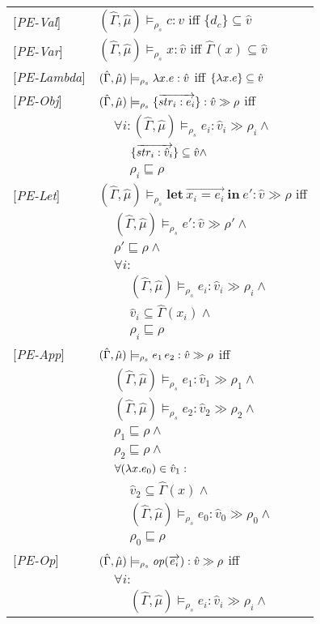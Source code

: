 \documentclass[[12pt,a4paper,twoside,openrigh]{article}
\newcommand{\vat}[0]{\hat{v}}
\newcommand{\muat}[0]{\hat{\mu}}
\newcommand{\Env}[0]{\hat{\Gamma}}
\newcommand{\modelrho}{\models_{\rho_s}}
\newcommand{\aenvs}{(\Env,\muat)}
\newcommand{\caesti}[2]{\aenvs \modelrho #1 : \vat_{#2} \gg \rho_{#2}}
\newcommand{\caest}[1]{\aenvs \modelrho #1 : \vat \gg \rho}
\newcommand{\letexprs}[3]{\mathbf{let}\ \vec{#1 = #2}\ \mathbf{in}\ #3}
\begin{document}
\begin{tabular}{l l l l}
{[\textit{PE-Val}]}&\multicolumn{3}{l}{$\aenvs \modelrho c : \vat$ iff $\{d_c\} \subseteq \vat$} \\
{[\textit{PE-Var}]}&\multicolumn{3}{l}{$\aenvs \modelrho x : \vat$ iff $\Env(x) \subseteq \vat$} \\ 
{[\textit{PE-Lambda}]}&\multicolumn{3}{l}{$\aenvs \modelrho \lam{x}{e} : \vat$ iff $\{\lam{x}{e}\} \subseteq \vat$} \\
{[\textit{PE-Obj}]}&\multicolumn{3}{l}{$\caest {\rec{\vec{str_i : e_i}}}$ iff} \\
&&\multicolumn{2}{l}{$\forall i: \caesti {e_i} {i} \wedge$}\\
&&&$\rec{\vec{str_i :\vat_i}} \subseteq \vat \wedge$ \\
&&&$\rho_i \sqsubseteq \rho$ \\ 
{[\textit{PE-Let}]}&\multicolumn{3}{l}{$\caest {\letexprs{x_i}{e_i}{e'}}$ iff}\\
&&\multicolumn{2}{l}{$\aenvs \modelrho e' : \vat \gg \rho' \wedge$} \\
&&\multicolumn{2}{l}{$\rho' \sqsubseteq \rho \wedge$} \\
&&\multicolumn{2}{l}{$ \forall i:$}\\
&&& $\caesti {e_i} {i} \wedge$ \\
&&& $\vat_i \subseteq \Env(x_i) \wedge$ \\
&&& $\rho_i \sqsubseteq \rho$ \\
{[\textit{PE-App}]}&\multicolumn{3}{l}{$\caest {\appl {e_1} {e_2}}$ iff} \\
&&\multicolumn{2}{l}{$\caesti {e_1} {1} \wedge$} \\
&&\multicolumn{2}{l}{$\caesti {e_2} {2} \wedge$} \\
&&\multicolumn{2}{l}{$\rho_1 \sqsubseteq \rho \wedge$} \\
&&\multicolumn{2}{l}{$\rho_2 \sqsubseteq \rho \wedge$} \\
&&\multicolumn{2}{l}{$\forall (\lam{x}{e_0}) \in \vat_1 :$}\\
&&&$\vat_2 \subseteq \Env(x) \wedge$\\
&&&$\caesti {e_0} {0} \wedge$\\ 
&&&$\rho_0 \sqsubseteq \rho $\\
{[\textit{PE-Op}]}&\multicolumn{3}{l}{$\caest {\op (\vec{e_i})} $ iff}\\
&&\multicolumn{2}{l}{$\forall i :$}\\
&&&$\caesti {e_i} {i} \wedge $\\

\end{tabular}
\end{document}
